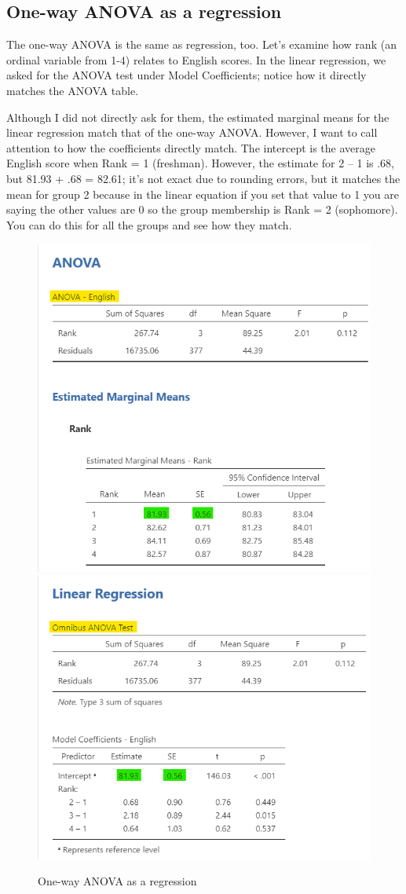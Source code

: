 \documentclass[
]{book}
\begin{document}
\hypertarget{one-way-anova-as-a-regression}{%
\subsection{One-way ANOVA as a regression}\label{one-way-anova-as-a-regression}}

The one-way ANOVA is the same as regression, too. Let's examine how rank (an ordinal variable from 1-4) relates to English scores. In the linear regression, we asked for the ANOVA test under Model Coefficients; notice how it directly matches the ANOVA table.

Although I did not directly ask for them, the estimated marginal means for the linear regression match that of the one-way ANOVA. However, I want to call attention to how the coefficients directly match. The intercept is the average English score when Rank = 1 (freshman). However, the estimate for 2 -- 1 is .68, but 81.93 + .68 = 82.61; it's not exact due to rounding errors, but it matches the mean for group 2 because in the linear equation if you set that value to 1 you are saying the other values are 0 so the group membership is Rank = 2 (sophomore). You can do this for all the groups and see how they match.

\begin{figure}

{\centering \includegraphics[width=0.49\linewidth]{images/14-regression-wrap-up/anova1} \includegraphics[width=0.49\linewidth]{images/14-regression-wrap-up/anova2} 

}

\caption{One-way ANOVA as a regression}\label{fig:unnamed-chunk-1}
\end{figure}
\end{document}
